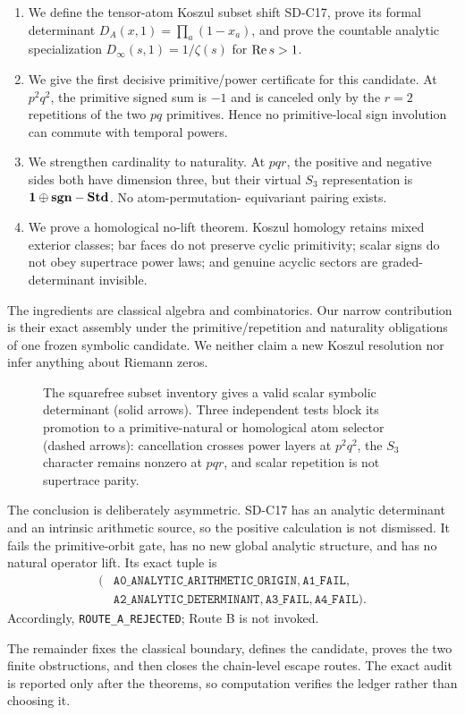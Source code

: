 \begin{enumerate}
\item We define the tensor-atom Koszul subset shift SD-C17, prove its formal
  determinant $D_A(x,1)=\prod_a(1-x_a)$, and prove the countable analytic
  specialization $D_\infty(s,1)=1/\zeta(s)$ for $\operatorname{Re} s>1$.
\item We give the first decisive primitive/power certificate for this
  candidate.  At $p^2q^2$, the primitive signed sum is $-1$ and is canceled
  only by the $r=2$ repetitions of the two $pq$ primitives.  Hence no
  primitive-local sign involution can commute with temporal powers.
\item We strengthen cardinality to naturality.  At $pqr$, the positive and
  negative sides both have dimension three, but their virtual $S_3$
  representation is $\mathbf 1\oplus\mathbf{sgn}-\mathbf{Std}$.  No atom-permutation-
  equivariant pairing exists.
\item We prove a homological no-lift theorem.  Koszul homology retains mixed
  exterior classes; bar faces do not preserve cyclic primitivity; scalar
  signs do not obey supertrace power laws; and genuine acyclic sectors are
  graded-determinant invisible.
\end{enumerate}

The ingredients are classical algebra and combinatorics.  Our narrow
contribution is their exact assembly under the primitive/repetition and
naturality obligations of one frozen symbolic candidate.  We neither claim a
new Koszul resolution nor infer anything about Riemann zeros.

\begin{figure}[t]
  \centering
  
  \caption{The squarefree subset inventory gives a valid scalar symbolic
  determinant (solid arrows).  Three independent tests block its promotion
  to a primitive-natural or homological atom selector (dashed arrows):
  cancellation crosses power layers at $p^2q^2$, the $S_3$ character remains
  nonzero at $pqr$, and scalar repetition is not supertrace parity.}
  \label{fig:no-lift-map}
\end{figure}

The conclusion is deliberately asymmetric.  SD-C17 has an analytic
determinant and an intrinsic arithmetic source, so the positive calculation
is not dismissed.  It fails the primitive-orbit gate, has no new global
analytic structure, and has no natural operator lift.  Its exact tuple is
\[
\begin{split}
(&\texttt{A0\_ANALYTIC\_ARITHMETIC\_ORIGIN},
  \texttt{A1\_FAIL},\\
 &\texttt{A2\_ANALYTIC\_DETERMINANT},
  \texttt{A3\_FAIL},\texttt{A4\_FAIL}).
\end{split}
\tag{1.3}
\]
Accordingly, \texttt{ROUTE\_A\_REJECTED}; Route B is not invoked.

The remainder fixes the classical boundary, defines the candidate, proves
the two finite obstructions, and then closes the chain-level escape routes.
The exact audit is reported only after the theorems, so computation verifies
the ledger rather than choosing it.
